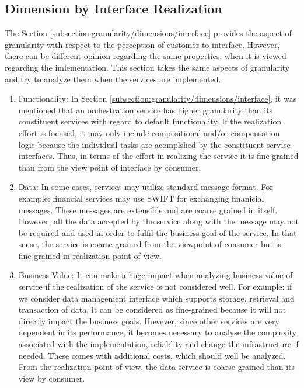 \subsection{Dimension by Interface Realization}\label{subsection:granularity/dimensions/interface_realization}
The Section \ref{subsection:granularity/dimensions/interface} provides the aspect of granularity with respect to the perception of customer to interface. However, there can be different opinion regarding the same properties, when it is viewed regarding the imlementation. This section takes the same aspects of granularity and try to analyze them when the services are implemented.
\begin{enumerate}
\item Functionality: In Section \ref{subsection:granularity/dimensions/interface}, it was mentioned that an orchestration service has higher granularity than its constituent services with regard to default functionality. If the realization effort is focused, it may only include compositional and/or compensation logic because the individual tasks are acomplshed by the constituent service interfaces. Thus, in terms of the effort in realizing the service it is fine-grained than from the view point of interface by consumer. \cite{Raf-Haesen:2015aa}
\\
\item Data: In some cases, services may utilize standard message format. For example: financial services may use \acrshort{SWIFT} for exchanging finanicial messages. These messages are extensible and are coarse grained in itself. However, all the data accepted by the service along with the message may not be required and used in order to fulfil the business goal of the service. In that sense, the service is coarse-grained from the viewpoint of consumer but is fine-grained in realization point of view. \cite{Raf-Haesen:2015aa}
\\
\item Business Value: It can make a huge impact when analyzing business value of service if the realization of the service is not considered well. For example: if we consider data management interface which supports storage, retrieval and transaction of data, it can be considered as fine-grained because it will not directly impact the business goals. However, since other services are very dependent in its performance, it becomes necessary to analyse the complexity associated with the implementation, reliablity and change the infrastructure if needed. These comes with additional costs, which should well be analyzed. From the realization point of view, the data service is coarse-grained than its view by consumer. \cite{Raf-Haesen:2015aa}
\end{enumerate}

